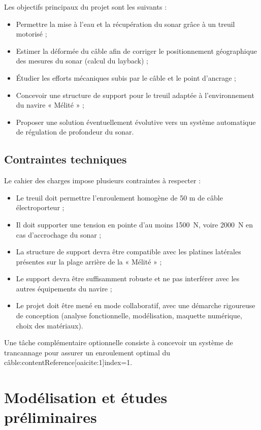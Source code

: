 \documentclass[12pt,a4paper]{article}
\begin{document}
Les objectifs principaux du projet sont les suivants :
\begin{itemize}
  \item Permettre la mise à l’eau et la récupération du sonar grâce à un treuil motorisé ;
  \item Estimer la déformée du câble afin de corriger le positionnement géographique des mesures du sonar (calcul du layback) ;
  \item Étudier les efforts mécaniques subis par le câble et le point d’ancrage ;
  \item Concevoir une structure de support pour le treuil adaptée à l’environnement du navire « Mélité » ;
  \item Proposer une solution éventuellement évolutive vers un système automatique de régulation de profondeur du sonar.
\end{itemize}

\subsection{Contraintes techniques}

Le cahier des charges impose plusieurs contraintes à respecter :
\begin{itemize}
  \item Le treuil doit permettre l’enroulement homogène de 50 m de câble électroporteur ;
  \item Il doit supporter une tension en pointe d’au moins 1500~N, voire 2000~N en cas d’accrochage du sonar ;
  \item La structure de support devra être compatible avec les platines latérales présentes sur la plage arrière de la « Mélité » ;
  \item Le support devra être suffisamment robuste et ne pas interférer avec les autres équipements du navire ;
  \item Le projet doit être mené en mode collaboratif, avec une démarche rigoureuse de conception (analyse fonctionnelle, modélisation, maquette numérique, choix des matériaux).
\end{itemize}

Une tâche complémentaire optionnelle consiste à concevoir un système de trancannage pour assurer un enroulement optimal du câble:contentReference[oaicite:1]{index=1}.


\section{Modélisation et études préliminaires}
\end{document}
